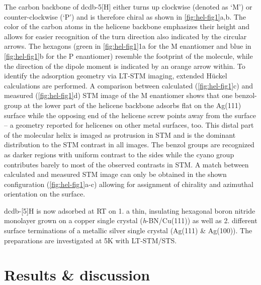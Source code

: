 The carbon backbone of dcdb-5[H] either turns up clockwise (denoted as ‘M’) or counter-clockwise (‘P’) and is therefore chiral as shown in \autoref{fig:hel-fig1}a,b. The color of the carbon atoms in the helicene backbone emphasizes their height and allows for easier recognition of the turn direction also indicated by the circular arrows. The hexagons (green in \autoref{fig:hel-fig1}1a for the M enantiomer and blue in \autoref{fig:hel-fig1}b for the P enantiomer) resemble the footprint of the molecule, while the direction of the dipole moment is indicated by an orange arrow within. To identify the adsorption geometry via LT-STM imaging, extended Hückel calculations are performed. A comparison between calculated (\autoref{fig:hel-fig1}c) and measured (\autoref{fig:hel-fig1}d) STM image of the M enantiomer shows that one benzol-group at the lower part of the helicene backbone  adsorbs flat on the Ag(111) surface while the opposing end of the helicene screw points away from the surface – a geometry reported for helicenes on other metal surfaces, too.\cite{Fasel_Orientation_2001} This distal part of the molecular helix is imaged as protrusion in STM and is the dominant distribution to the STM contrast in all images. The benzol groups are recognized as darker regions with uniform contrast to the sides while the cyano group contributes barely to most of the observed contrasts in STM. A match between calculated and measured STM image can only be obtained in the shown configuration (\autoref{fig:hel-fig1}a-c) allowing for assignment of chirality and azimuthal orientation on the surface.

dcdb-[5]H is now adsorbed at RT on 1. a thin, insulating hexagonal boron nitride monolayer grown on a copper single crystal (\textit{h}-BN/Cu(111)) as well as 2. different surface terminations of a metallic silver single crystal (Ag(111) \& Ag(100)). The preparations are investigated at 5K with LT-STM/STS.

\section{Results \& discussion}

